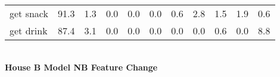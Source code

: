 \documentclass{article}
\begin{document}
\begin{sideways}
\begin{tabular}{lrrrrrrrrrr}
get snack         &        91.3 &                1.3 &               0.0 &                0.0 &                0.0 &              0.6 &                      2.8 &                   1.5 &              1.9 &              0.6 \\
get drink         &        87.4 &                3.1 &               0.0 &                0.0 &                0.0 &              0.0 &                      0.0 &                   0.6 &              0.0 &              8.8 \\
\bottomrule
\end{tabular}
\end{sideways}
\normalsize
\vspace{1cm}\\
\textbf{House B Model NB Feature Change}\\
\vspace{1cm}\\
\end{document}
